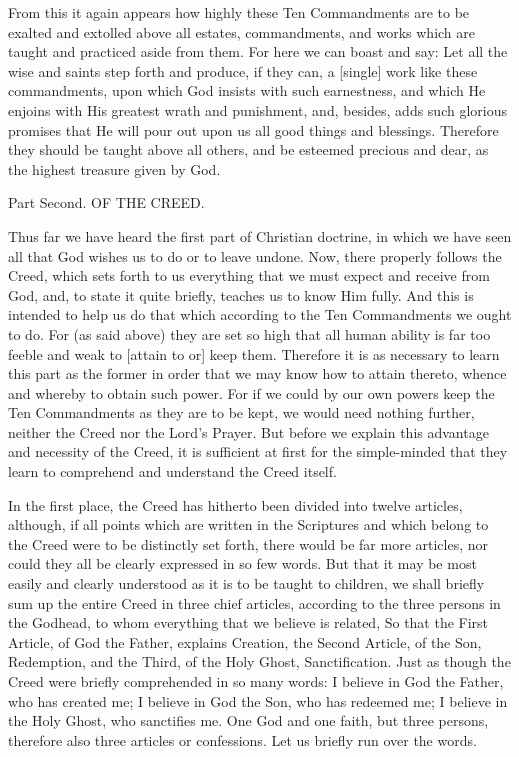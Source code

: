 From this it again appears how highly these Ten Commandments are to be
exalted and extolled above all estates, commandments, and works which
are taught and practiced aside from them. For here we can boast and
say: Let all the wise and saints step forth and produce, if they can, a
[single] work like these commandments, upon which God insists with such
earnestness, and which He enjoins with His greatest wrath and
punishment, and, besides, adds such glorious promises that He will pour
out upon us all good things and blessings. Therefore they should be
taught above all others, and be esteemed precious and dear, as the
highest treasure given by God.

Part Second. OF THE CREED.

Thus far we have heard the first part of Christian doctrine, in which
we have seen all that God wishes us to do or to leave undone. Now,
there properly follows the Creed, which sets forth to us everything
that we must expect and receive from God, and, to state it quite
briefly, teaches us to know Him fully. And this is intended to help us
do that which according to the Ten Commandments we ought to do. For (as
said above) they are set so high that all human ability is far too
feeble and weak to [attain to or] keep them. Therefore it is as
necessary to learn this part as the former in order that we may know
how to attain thereto, whence and whereby to obtain such power. For if
we could by our own powers keep the Ten Commandments as they are to be
kept, we would need nothing further, neither the Creed nor the Lord's
Prayer. But before we explain this advantage and necessity of the
Creed, it is sufficient at first for the simple-minded that they learn
to comprehend and understand the Creed itself.

In the first place, the Creed has hitherto been divided into twelve
articles, although, if all points which are written in the Scriptures
and which belong to the Creed were to be distinctly set forth, there
would be far more articles, nor could they all be clearly expressed in
so few words. But that it may be most easily and clearly understood as
it is to be taught to children, we shall briefly sum up the entire
Creed in three chief articles, according to the three persons in the
Godhead, to whom everything that we believe is related, So that the
First Article, of God the Father, explains Creation, the Second
Article, of the Son, Redemption, and the Third, of the Holy Ghost,
Sanctification. Just as though the Creed were briefly comprehended in
so many words: I believe in God the Father, who has created me; I
believe in God the Son, who has redeemed me; I believe in the Holy
Ghost, who sanctifies me. One God and one faith, but three persons,
therefore also three articles or confessions. Let us briefly run over
the words.

